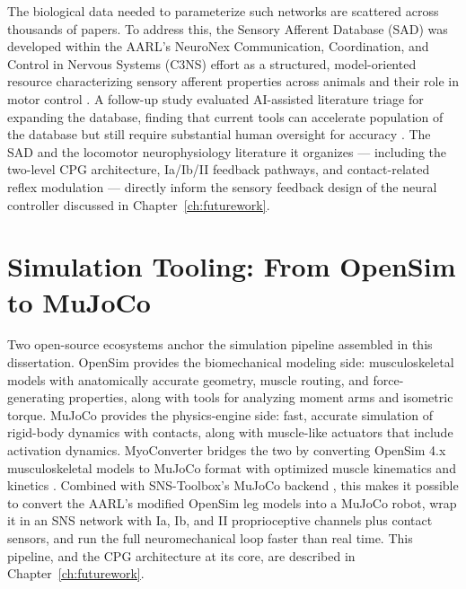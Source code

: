 The biological data needed to parameterize such networks are scattered across thousands of papers. To address this, the Sensory Afferent Database (SAD) was developed within the AARL's NeuroNex Communication, Coordination, and Control in Nervous Systems (C3NS) effort as a structured, model-oriented resource characterizing sensory afferent properties across animals and their role in motor control \citep{bolen_sensory_2023}. A follow-up study evaluated AI-assisted literature triage for expanding the database, finding that current tools can accelerate population of the database but still require substantial human oversight for accuracy \citep{bolen_using_2024}. The SAD and the locomotor neurophysiology literature it organizes --- including the two-level CPG architecture, Ia/Ib/II feedback pathways, and contact-related reflex modulation --- directly inform the sensory feedback design of the neural controller discussed in Chapter~\ref{ch:futurework}.

\section{Simulation Tooling: From OpenSim to MuJoCo}\label{sec:bg_tools}

Two open-source ecosystems anchor the simulation pipeline assembled in this dissertation. OpenSim \citep{delp_opensim_2007, seth_opensim_2018} provides the biomechanical modeling side: musculoskeletal models with anatomically accurate geometry, muscle routing, and force-generating properties, along with tools for analyzing moment arms and isometric torque. MuJoCo \citep{todorov_mujoco_2012} provides the physics-engine side: fast, accurate simulation of rigid-body dynamics with contacts, along with muscle-like actuators that include activation dynamics. MyoConverter bridges the two by converting OpenSim 4.x musculoskeletal models to MuJoCo format with optimized muscle kinematics and kinetics \citep{caggiano_myosuite_2022, wang_myosim_2022}. Combined with SNS-Toolbox's MuJoCo backend \citep{nourse_sns_2023}, this makes it possible to convert the AARL's modified OpenSim leg models into a MuJoCo robot, wrap it in an SNS network with Ia, Ib, and II proprioceptive channels plus contact sensors, and run the full neuromechanical loop faster than real time. This pipeline, and the CPG architecture at its core, are described in Chapter~\ref{ch:futurework}.

